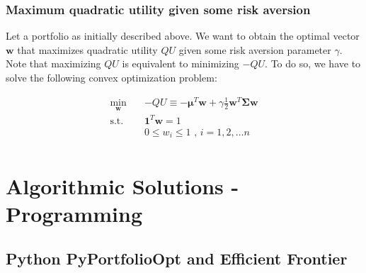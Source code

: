 \documentclass{beamer}
\begin{document}
\begin{frame}
\frametitle{\textbf{Maximum quadratic utility given some risk aversion}}

\justifying
Let a portfolio as initially described above. We want to obtain the optimal vector $\mathbf{w}$ that maximizes quadratic utility $QU$ given some risk aversion parameter $\gamma$. Note that maximizing $QU$ is equivalent to minimizing $-QU$. To do so, we have to solve the following convex optimization problem:

\vspace{0.2cm}
\justifying
\begin{equation}
\begin{aligned}
\label{eq:5}
\min_{\mathbf{w}} \quad & - QU \equiv -\boldsymbol\mu^{T} \mathbf{w} + \gamma \frac{1}{2}\mathbf{w}^{T}\mathbf{\Sigma}\mathbf{w} \\
\textrm{s.t.} \quad & \mathbf{1}^{T} \mathbf{w} = 1 \\
                             & 0 \leq w_{i} \leq 1 \textrm{ , } i = 1, 2, \dots n \\
\end{aligned}
\end{equation}

\end{frame}
















\section{Algorithmic Solutions - Programming}










\subsection{Python PyPortfolioOpt and Efficient Frontier}
\end{document}

